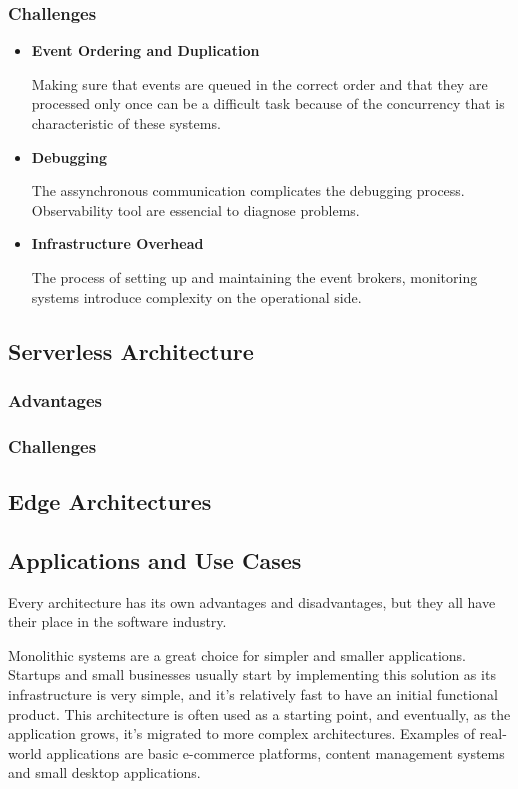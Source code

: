 \subsubsection{Challenges}
\begin{itemize}
	\item \textbf{Event Ordering and Duplication}

	      Making sure that events are queued in the correct order and that they are
	      processed only once can be a difficult task because of the concurrency
	      that is characteristic of these systems.

	\item \textbf{Debugging}

	      The assynchronous communication complicates the debugging process.
	      Observability tool are essencial to diagnose problems.

	\item \textbf{Infrastructure Overhead}

	      The process of setting up and maintaining the event brokers, monitoring
	      systems introduce complexity on the operational side.
\end{itemize}

\subsection{Serverless Architecture}

\subsubsection{Advantages}
\subsubsection{Challenges}

\subsection{Edge Architectures}

\subsection{Applications and Use Cases}
Every architecture has its own advantages and disadvantages, but they all have
their place in the software industry.

Monolithic systems are a great choice for simpler and smaller applications.
Startups and small businesses usually start by implementing this solution as
its infrastructure is very simple, and it's relatively fast to have an initial
functional product. This architecture is often used as a starting point, and
eventually, as the application grows, it's migrated to more complex architectures.
Examples of real-world applications are basic e-commerce platforms, content
management systems and small desktop applications.

